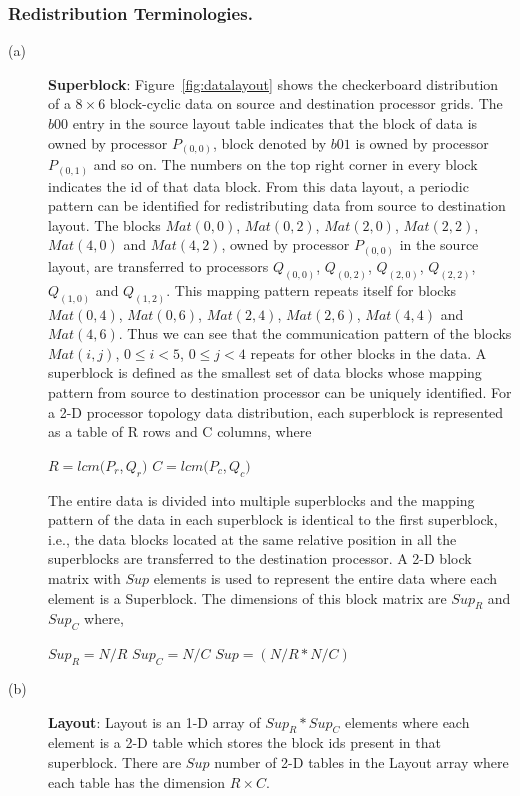 \documentclass[letterpaper]{llncs}
\begin{document}
\subsubsection{Redistribution Terminologies.}
\begin{description}
\item[(a)] \textbf{Superblock}: Figure~\ref{fig:datalayout} shows the checkerboard distribution of a $8 \times 6$ block-cyclic data on source and destination processor grids. 
The $b00$ entry in the source layout table indicates that the block of data is owned by processor $P_{(0,0)}$, block denoted by $b01$ is owned by processor $P_{(0,1)}$ and so on. 
The numbers on the top right corner in every block indicates the id of that data block. From this data layout, a periodic pattern can be identified for redistributing
data from source to destination layout. The blocks $Mat(0,0)$, $Mat(0,2)$, $Mat(2,0)$, $Mat(2,2)$, $Mat(4,0)$ and $Mat(4,2)$, owned by processor $P_{(0,0)}$ in the source layout, are transferred to processors $Q_{(0,0)}$,
$Q_{(0,2)}$, $Q_{(2,0)}$, $Q_{(2,2)}$, $Q_{(1,0)}$ and $Q_{(1,2)}$. This mapping pattern repeats itself for blocks $Mat(0,4)$, $Mat(0,6)$, $Mat(2,4)$, $Mat(2,6)$, $Mat(4,4)$ and $Mat(4,6)$. 
Thus we can see that the communication pattern of the blocks $Mat(i, j)$, $0 \leq i< 5$, $0 \leq j < 4$ repeats for other blocks in the data. 
A superblock is defined as the  smallest set of data blocks whose mapping pattern 
from source to destination processor can be uniquely identified. 
For a 2-D processor topology data distribution, each superblock is represented as 
a table of R rows and C columns, where 

\hspace{0.2in}  $R = lcm(P_{r}$,\,$Q_{r})$\hspace{1in} $C = lcm(P_{c}$,\,$Q_{c})$

The entire data is divided into multiple superblocks and the mapping pattern of
the data in each superblock
is identical to the first superblock, i.e., the data blocks located at the same relative position                                                                               in all the superblocks are                                                              transferred to the destination processor.
A 2-D block matrix with $Sup$ elements is used to represent the entire data where each 
element is a Superblock. The dimensions of this block matrix are $Sup_R$ and $Sup_C$ where,

\hspace{0.2in}$Sup_R = N/R$ \hspace{0.5in} $Sup_C = N/C$ \hspace{0.5in}$Sup = (N/R\ast N/C)$
\item[(b)] \textbf{Layout}: Layout is an 1-D array of $Sup_R \ast Sup_C$ elements where each element 
is a 2-D table which stores the block ids present in that superblock. There are $Sup$ number of 2-D tables in the Layout array 
where each table has the dimension $R\times C$.


\end{description}
\end{document}
